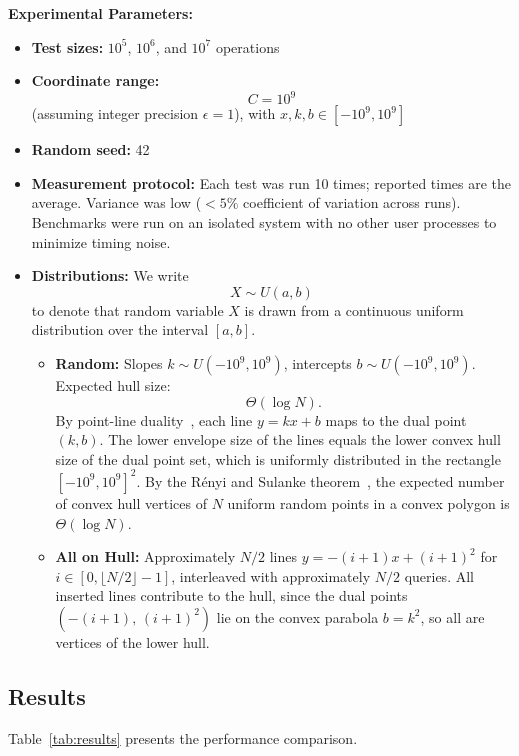 \documentclass[11pt,a4paper]{article}
\theoremstyle{definition}
\theoremstyle{plain}
\begin{document}
\textbf{Experimental Parameters:}
\begin{itemize}
\item \textbf{Test sizes:} $10^5$, $10^6$, and $10^7$ operations
\item \textbf{Coordinate range:}
\[
C = 10^9
\]
(assuming integer precision $\epsilon = 1$), with $x, k, b \in [-10^9, 10^9]$
\item \textbf{Random seed:} 42
\item \textbf{Measurement protocol:} Each test was run 10 times; reported times are the average. Variance was low ($<5\%$ coefficient of variation across runs). Benchmarks were run on an isolated system with no other user processes to minimize timing noise.
\item \textbf{Distributions:} We write
\[
X \sim U(a, b)
\]
to denote that random variable $X$ is drawn from a continuous uniform distribution over the interval $[a, b]$.
\begin{itemize}
\item \textbf{Random:} Slopes $k \sim U(-10^9, 10^9)$, intercepts $b \sim U(-10^9, 10^9)$. Expected hull size:
\[
\Theta(\log N).
\]
By point-line duality~\cite{deBerg2008}, each line $y = kx + b$ maps to the dual point $(k, b)$. The lower envelope size of the lines equals the lower convex hull size of the dual point set, which is uniformly distributed in the rectangle $[-10^9, 10^9]^2$. By the R\'{e}nyi and Sulanke theorem~\cite{renyi1963}, the expected number of convex hull vertices of $N$ uniform random points in a convex polygon is $\Theta(\log N)$.
\item \textbf{All on Hull:} Approximately $N/2$ lines $y = -(i+1)x + (i+1)^2$ for $i \in [0, \lfloor N/2 \rfloor - 1]$, interleaved with approximately $N/2$ queries. All inserted lines contribute to the hull, since the dual points $(-(i+1),\,(i+1)^2)$ lie on the convex parabola $b = k^2$, so all are vertices of the lower hull.
\end{itemize}
\end{itemize}

\subsection{Results}

Table~\ref{tab:results} presents the performance comparison.
\end{document}
